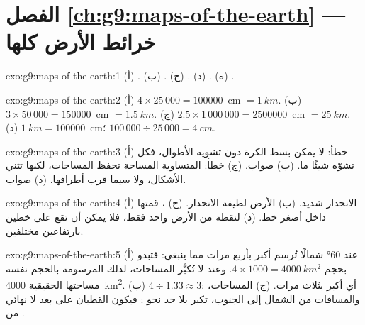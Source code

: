 \section*{الفصل \ref{ch:g9:maps-of-the-earth} --- خرائط الأرض كلها}

\begin{solution}{exo:g9:maps-of-the-earth:1}
(أ) . (ب) . (ج) . (د) . (ه) .
\end{solution}

\begin{solution}{exo:g9:maps-of-the-earth:2}
(أ) $4 \times 25\,000 = \num{100000}$~cm $= \qty{1}{km}$. (ب) $3 \times
50\,000 = \num{150000}$~cm $= \qty{1.5}{km}$. (ج) $2.5 \times 1\,000\,000
= \num{2500000}$~cm $= \qty{25}{km}$. (د) $\qty{1}{km} = \num{100000}$~cm؛
$100\,000 \div 25\,000 = \qty{4}{cm}$.
\end{solution}

\begin{solution}{exo:g9:maps-of-the-earth:3}
(أ) خطأ: لا يمكن بسط الكرة دون تشويه الأطوال، فكل  تشوّه
شيئًا ما. (ب) صواب. (ج) خطأ:  المتساوية المساحة تحفظ المساحات،
لكنها تثني الأشكال، ولا سيما قرب أطرافها. (د) صواب.
\end{solution}

\begin{solution}{exo:g9:maps-of-the-earth:4}
(أ) الانحدار شديد. (ب) الأرض لطيفة الانحدار. (ج) ، قمتها داخل أصغر
خط. (د) لنقطة من الأرض  واحد فقط، فلا يمكن أن تقع على خطين
بارتفاعين مختلفين.
\end{solution}

\begin{solution}{exo:g9:maps-of-the-earth:5}
(أ) عند \ang{60} شمالًا تُرسم  أكبر بأربع مرات مما ينبغي: فتبدو بحجم
$4 \times 1000 = \qty{4000}{km^2}$. وعند  لا تُكبَّر المساحات، لذلك
 المرسومة بالحجم نفسه مساحتها الحقيقية \qty{4000}{km^2}.
(ب) $4 \div 1.33 \approx 3$: أي أكبر بثلاث مرات. (ج) المساحات، والمسافات
من الشمال إلى الجنوب، تكبر بلا حد نحو : فيكون القطبان على بعد لا
نهائي من .
\end{solution}

